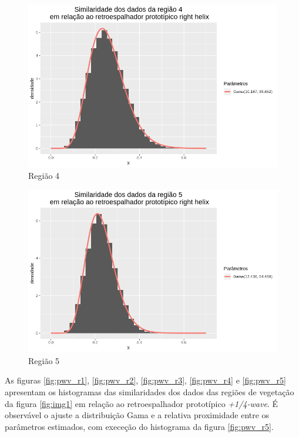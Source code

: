 \documentclass[12pt]{article}
\begin{document}
\begin{figure}[!h]
    \centering
    \vspace{0.1\linewidth}
    \includegraphics[width = \linewidth]{../../Images/Report_18_12_20/rh_region4.png}
    \caption{Região 4}
    \label{fig:rh_r4}
\end{figure}

\begin{figure}[!h]
    \centering
    \includegraphics[width = \linewidth]{../../Images/Report_18_12_20/rh_region5.png}
    \caption{Região 5}
    \label{fig:rh_r5}
\end{figure}

As figuras \ref{fig:pwv_r1}, \ref{fig:pwv_r2}, \ref{fig:pwv_r3}, \ref{fig:pwv_r4} e \ref{fig:pwv_r5} apresentam os histogramas das similaridades dos dados das regiões de vegetação da figura \ref{fig:img1} em relação ao retroespalhador prototípico \textit{+1/4-wave}. É observável o ajuste a distribuição Gama e a relativa proximidade entre os parâmetros estimados, com execeção do histograma da figura \ref{fig:pwv_r5}.
\end{document}

